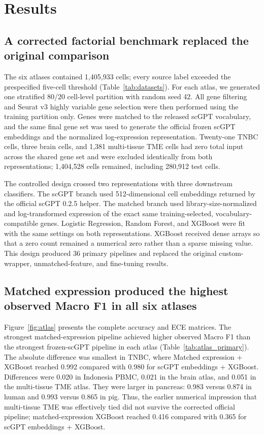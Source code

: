 \section{Results}

\subsection{A corrected factorial benchmark replaced the original comparison}

The six atlases contained 1,405,933 cells; every source label exceeded the prespecified five-cell threshold (Table~\ref{tab:datasets}). For each atlas, we generated one stratified 80/20 cell-level partition with random seed 42. All gene filtering and Seurat v3 highly variable gene selection were then performed using the training partition only. Genes were matched to the released scGPT vocabulary, and the same final gene set was used to generate the official frozen scGPT embeddings and the normalized log-expression representation. Twenty-one TNBC cells, three brain cells, and 1,381 multi-tissue TME cells had zero total input across the shared gene set and were excluded identically from both representations; 1,404,528 cells remained, including 280,912 test cells.

The controlled design crossed two representations with three downstream classifiers. The scGPT branch used 512-dimensional cell embeddings returned by the official scGPT 0.2.5 helper. The matched branch used library-size-normalized and log-transformed expression of the exact same training-selected, vocabulary-compatible genes. Logistic Regression, Random Forest, and XGBoost were fit with the same settings on both representations. XGBoost received dense arrays so that a zero count remained a numerical zero rather than a sparse missing value. This design produced 36 primary pipelines and replaced the original custom-wrapper, unmatched-feature, and fine-tuning results.



\subsection{Matched expression produced the highest observed Macro F1 in all six atlases}

Figure~\ref{fig:atlas} presents the complete accuracy and ECE matrices. The strongest matched-expression pipeline achieved higher observed Macro F1 than the strongest frozen-scGPT pipeline in each atlas (Table~\ref{tab:atlas_primary}). The absolute difference was smallest in TNBC, where Matched expression + XGBoost reached 0.992 compared with 0.980 for scGPT embeddings + XGBoost. Differences were 0.020 in Indonesia PBMC, 0.021 in the brain atlas, and 0.051 in the multi-tissue TME atlas. They were larger in pancreas: 0.983 versus 0.874 in human and 0.993 versus 0.865 in pig. Thus, the earlier numerical impression that multi-tissue TME was effectively tied did not survive the corrected official pipeline; matched-expression XGBoost reached 0.416 compared with 0.365 for scGPT embeddings + XGBoost.

